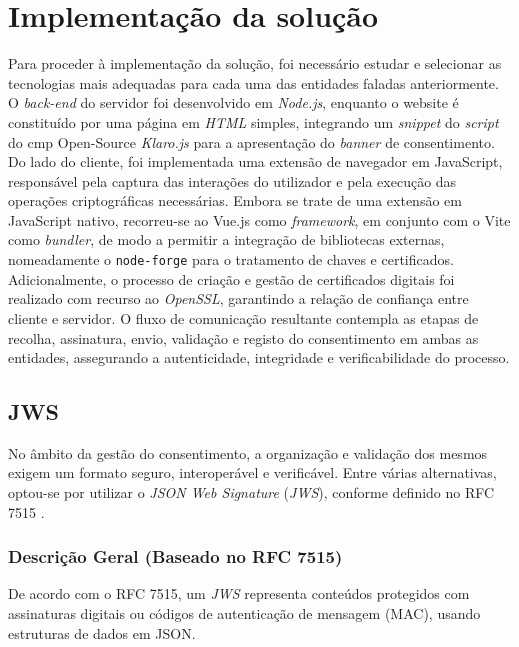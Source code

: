 \chapter{Implementação da solução}

Para proceder à implementação da solução, foi necessário estudar e selecionar as tecnologias mais adequadas para cada uma das entidades faladas anteriormente. O \textit{back-end} do servidor foi desenvolvido em \textit{Node.js}, enquanto o website é constituído por uma página em \textit{HTML} simples, integrando um \textit{snippet} do \textit{script} do \acrshort{cmp} Open-Source \textit{Klaro.js} para a apresentação do \textit{banner} de consentimento.
Do lado do cliente, foi implementada uma extensão de navegador em JavaScript, responsável pela captura das interações do utilizador e pela execução das operações criptográficas necessárias. Embora se trate de uma extensão em JavaScript nativo, recorreu-se ao Vue.js como \textit{framework}, em conjunto com o Vite como \textit{bundler}, de modo a permitir a integração de bibliotecas externas, nomeadamente o \texttt{node-forge} para o tratamento de chaves e certificados. Adicionalmente, o processo de criação e gestão de certificados digitais foi realizado com recurso ao \textit{OpenSSL}, garantindo a relação de confiança entre cliente e servidor. O fluxo de comunicação resultante contempla as etapas de recolha, assinatura, envio, validação e registo do consentimento em ambas as entidades, assegurando a autenticidade, integridade e verificabilidade do processo.

\section{JWS}

No âmbito da gestão do consentimento, a organização e validação dos mesmos exigem um formato seguro, interoperável e verificável. Entre várias alternativas, optou-se por utilizar o \textit{JSON Web Signature} (\textit{JWS}), conforme definido no RFC 7515 \citep{rfc7515}.

\subsection{Descrição Geral (Baseado no RFC 7515)}

De acordo com o RFC 7515, um \textit{JWS} representa conteúdos protegidos com assinaturas digitais ou códigos de autenticação de mensagem (MAC), usando estruturas de dados em JSON.

